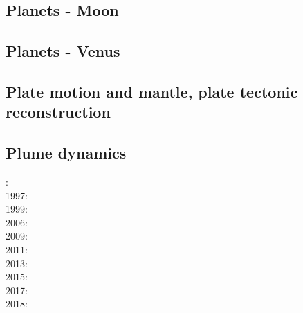 \cite{scbg90}
\cite{nist01}
\cite{vavv05}
\cite{seki14}
\cite{zhon16}

\subsection*{Planets - Moon}

\cite{zhdv19}

\subsection*{Planets - Venus}

\cite{scbg90}
\cite{kiha92}
\cite{somo96}
\cite{mazk98}\cite{moso98}
\cite{vavv05}
\cite{arta12}
\cite{cram17}\cite{dast17}
\cite{king18}



\subsection*{Plate motion and mantle, plate tectonic reconstruction}

\noindent
\cite{mcse73}
\cite{zieg92a}
\cite{zhgm98}
\cite{evan03}
\cite{lizh09}\cite{vasv09}
\cite{huss12}\cite{gutz12}
\cite{mosq13}
\cite{yoha15}
\cite{tewg19}

\subsection*{Plume dynamics}

: \cite{nasf94}\cite{hayu94}\\
1997: \cite{vank97}\\
1999: \cite{lays99}\\
2006: \cite{isst06}\cite{liva06a}\cite{liva06b}\cite{zhon06}\\
2009: \cite{vavl09}\\
2011: \cite{toyu11}\cite{talz11}\cite{burk11}\cite{memm11}\\
2013: \cite{dagm13}\cite{madd13}\cite{ande13}\\
2015: \cite{daso15}\cite{hafg15}\\
2017: \cite{zhli17}\\
2018: \cite{dacc18}

